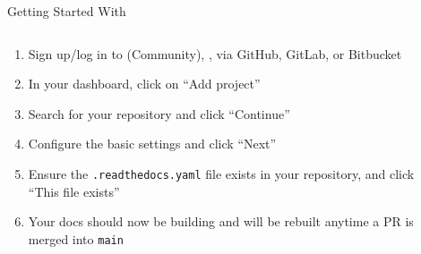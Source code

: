 \begin{frame}[fragile]{Getting Started With \rtd}
  \begin{columns}[onlytextwidth]
    \begin{column}{0.48\textwidth}
      \begin{enumerate}
        \setlength{\itemsep}{1em}
        \setcounter{enumi}{1}
        \item <1-> Sign up/log in to \rtd{} (Community), \eg, via GitHub, GitLab, or Bitbucket
        \item <2-> In your dashboard, click on \enquote{Add project}
        \item <3-> Search for your repository and click \enquote{Continue}
        \item <4-> Configure the basic settings and click \enquote{Next}
        \item <5-> Ensure the \texttt{.readthedocs.yaml} file exists in your repository, and click \enquote{This file exists}
        \item <6-> Your docs should now be building and will be rebuilt anytime a PR is merged into \texttt{main}
      \end{enumerate}
    \end{column}
    \hfill
    \begin{column}{0.48\textwidth}
\end{column}
\end{columns}
\end{frame}
